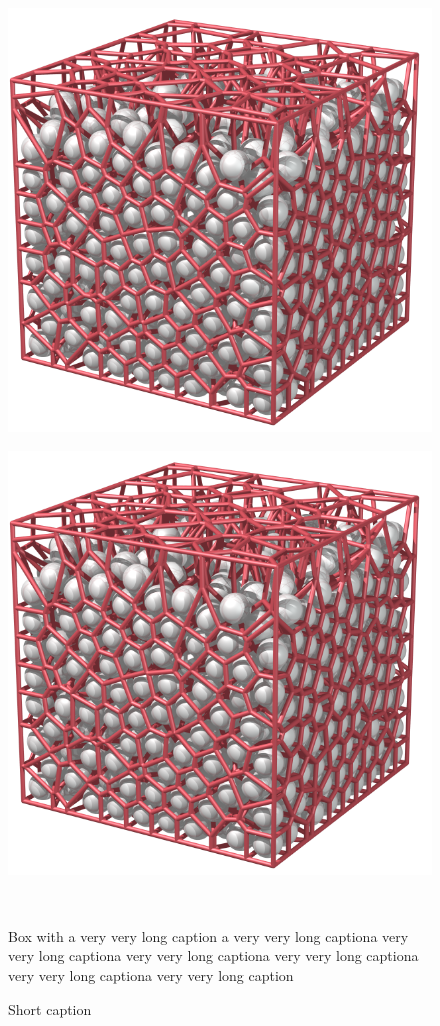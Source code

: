 \begin{figure}
\centering
\begin{minipage}{.5\textwidth}
  \centering
  \includegraphics[width=.4\linewidth]{images/voronoi/import_AM2_A001.png}
  \label{fig:test1}
\end{minipage}%
\begin{minipage}{.5\textwidth}
  \centering
  \includegraphics[width=.4\linewidth]{images/voronoi/import_AM2_A001.png}
  \label{fig:test2}
\end{minipage}
\end{figure}

\begin{figure}
    \centering
    \begin{minipage}[b]{.45\linewidth}
        \centering
        \fbox{\rule{.9\linewidth}{0pt}\rule{0pt}{3cm}}
    \end{minipage}%
    \hfill%
    \begin{minipage}[b]{.45\linewidth}
    \centering
        \centering
        \fbox{\rule{.9\linewidth}{0pt}\rule{0pt}{2cm}}
    \end{minipage}\\[-7pt]
    \begin{minipage}[t]{.45\linewidth}
        \caption{Box with a very very long caption a very very long captiona very very long captiona very very long captiona very very long captiona very very long captiona very very long caption}
    \end{minipage}%
    \hfill%
    \begin{minipage}[t]{.45\linewidth}
        \caption{Short caption}
    \end{minipage}%
\end{figure}

